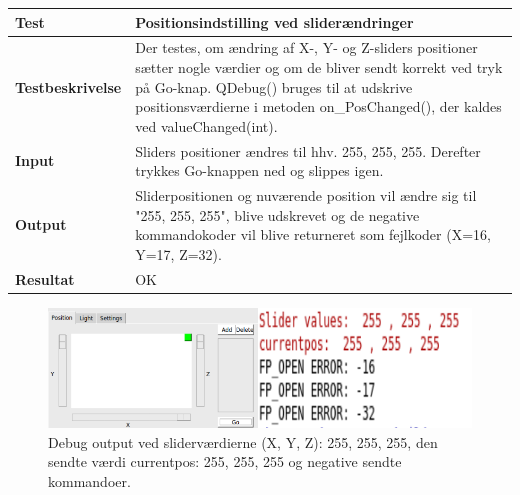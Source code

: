 \begin{table}[H]
\begin{tabular}{|l|l|}\hline
\textbf{Test} & Positionsindstilling ved sliderændringer \\\hline

\textbf{Testbeskrivelse} & \multicolumn{1}{|m{11.5cm}|}{Der testes, om ændring af X-, Y- og Z-sliders positioner sætter nogle værdier og om de bliver sendt korrekt ved tryk på Go-knap.  QDebug() bruges til at udskrive positionsværdierne i metoden on\_PosChanged(), der kaldes ved valueChanged(int).} \\\hline


\textbf{Input} & \multicolumn{1}{|m{11.5cm}|}{Sliders positioner ændres til hhv. 255, 255, 255. Derefter trykkes Go-knappen ned og slippes igen.} \\\hline

\textbf{Output} & \multicolumn{1}{|m{11.5cm}|}{ Sliderpositionen og nuværende position vil ændre sig til "255, 255, 255", blive udskrevet og de negative kommandokoder vil blive returneret som fejlkoder (X=16, Y=17, Z=32).} \\\hline

\textbf{Resultat} & \multicolumn{1}{|m{11.5cm}|}{ OK} \\\hline

\end{tabular}
\end{table}

\begin{figure}[H]
\centering
\includegraphics[width=1.0\linewidth]{0_Filer/Figuer/testPosition.png}
\caption{Debug output ved sliderværdierne (X, Y, Z): 255, 255, 255, den sendte værdi currentpos: 255, 255, 255 og negative sendte kommandoer.}
\label{fig:testPosition}
\end{figure}


